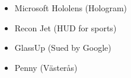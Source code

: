 \begin{itemize}
\item Microsoft Hololens (Hologram)\\
\item Recon Jet (HUD for sports)
\item GlassUp (Sued by Google)
\item Penny (Västerås)\\
\end{itemize}

